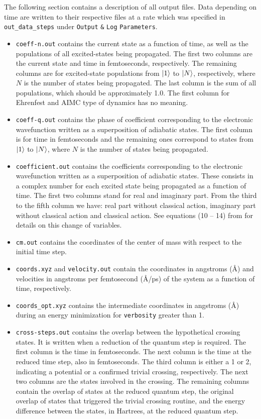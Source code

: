 \noindent The following section contains a description of all output files. Data depending on time are written to their respective files at a rate which was specified in \verb+out_data_steps+ under \verb+Output+ \verb+&+ \verb+Log+ \verb+Parameters+.
\begin{itemize}
\item \verb+coeff-n.out+ contains the current state as a function of time, as well as the populations of all excited-states being propagated.  The first two columns are the current state and time in femtoseconds, respectively.  The remaining columns are for excited-state populations from $\ket{1}$ to $\ket{N}$, respectively, where $N$ is the number of states being propagated.  The last column is the sum of all populations, which should be approximately 1.0. The first column for Ehrenfest and AIMC type of dynamics has no meaning.
\item \verb+coeff-q.out+ contains the phase of coefficient corresponding to the electronic wavefunction written as a superposition of adiabatic states. The first column is for time in femtoseconds and the remaining ones correspond to states from $\ket{1}$ to $\ket{N}$, where $N$ is the number of states being propagated.
\item \verb+coefficient.out+ contains the coefficients corresponding to the electronic wavefunction written as a superposition of adiabatic states. These consists in a complex number for each excited state being propagated as a function of time. The first two columns stand for real and imaginary part. From the third to the fifth column we have: real part without classical action, imaginary part without classical action and classical action. See equations (10 -- 14) from \cite{freixas2018ab} for details on this change of variables.
\item \verb+cm.out+ contains the coordinates of the center of mass with respect to the initial time step.
\item \verb+coords.xyz+ and \verb+velocity.out+ contain the coordinates in angstroms (\AA) and velocities in angstroms per femtosecond (\AA/ps) of the system as a function of time, respectively.
\item \verb+coords_opt.xyz+ contains the intermediate coordinates in angstroms (\AA) during an energy minimization for \verb+verbosity+ greater than 1.
\item \verb+cross-steps.out+ contains the overlap between the hypothetical crossing states. It is written when a reduction of the quantum step is required.  The first column is the time in femtoseconds.  The next column is the time at the reduced time step, also in femtoseconds.  The third column is either a 1  or 2, indicating a potential or a confirmed trivial crossing, respectively.  The next two columns are the states involved in the crossing.  The remaining columns contain the overlap of states at the reduced quantum step, the original overlap of states that triggered the trivial crossing routine, and the energy difference between the states, in Hartrees, at the reduced quantum step.

\end{itemize}
